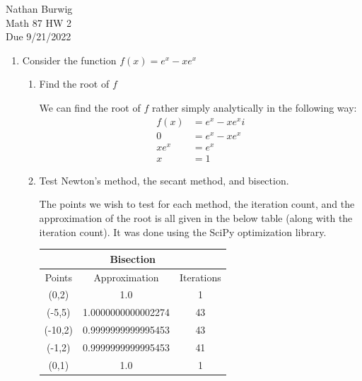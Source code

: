 \documentclass[11pt]{article}
\begin{document}
\noindent Nathan Burwig \\
Math 87 HW 2 \\
Due 9/21/2022

\hrulefill

\begin{enumerate}

\item Consider the function $f(x) = e^x - xe^x$
\begin{enumerate}

\item Find the root of $f$

    We can find the root of $f$ rather simply analytically in the following
    way:
    \begin{align*}
        f(x) &= e^x - xe^xi \\
        0 &= e^x - xe^x \\
        xe^x &= e^x \\
        x &= 1
    \end{align*}

\item Test Newton's method, the secant method, and bisection.

    The points we wish to test for each method, the iteration count, and the
    approximation of the root is all given in the below table (along with the
    iteration count). It was done using the SciPy optimization library.

    \begin{center}
        \begin{tabular}{||c | c | c||}
            \hline
            \multicolumn{3}{||c||}{Bisection} \\
            \hline
            Points & Approximation & Iterations \\
            \hline \hline
            
            (0,2)   & 1.0                   & 1  \\
            (-5,5)  & 1.0000000000002274    & 43 \\
            (-10,2) & 0.9999999999995453    & 43 \\
            (-1,2)  & 0.9999999999995453    & 41 \\
            (0,1)   & 1.0                   & 1  \\
            \hline
        \end{tabular}
    \end{center}



\end{enumerate}
\end{enumerate}
\end{document}
